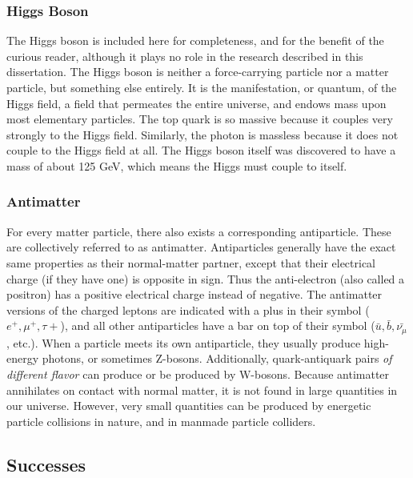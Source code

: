 \subsubsection*{Higgs Boson}
The Higgs boson is included here for completeness, and for the benefit
of the curious reader, although it plays
no role in the research described in this dissertation. The Higgs
boson is neither a force-carrying particle nor a matter particle, but
something else entirely. It is the manifestation, or quantum, of the
Higgs field, a field that permeates the entire universe, and endows
mass upon most elementary particles. The top quark is so massive
because it couples very strongly to the Higgs field. Similarly, the
photon is massless because it does not couple to the Higgs field at all.
The Higgs boson itself was discovered to have a mass of about 125 GeV,
which means the Higgs must couple to itself.

\subsubsection*{Antimatter}
For every matter particle, there also exists a corresponding
antiparticle. These are collectively referred to as
antimatter. Antiparticles generally have the exact same properties as
their normal-matter partner, except that their electrical charge (if
they have one) is opposite in sign. Thus the anti-electron (also
called a positron) has a positive electrical charge instead of
negative. The antimatter versions of the charged leptons are indicated
with a plus in their symbol ($e^+, \mu^+, \tau+$), and all other
antiparticles have a bar on top of their symbol ($\bar{u},
\bar{b}, \bar{\nu_{\mu}}$, etc.). When a particle meets its own
antiparticle, they usually produce high-energy photons, or sometimes
Z-bosons. Additionally, quark-antiquark pairs \emph{of different
  flavor} can produce or be produced by W-bosons. Because antimatter
annihilates on contact with normal matter, it is not found
in large quantities in our universe. However, very small quantities can be
produced by energetic particle collisions in nature, and in manmade
particle colliders.


\subsection{Successes}
\label{ssec:SMsuccesses}

